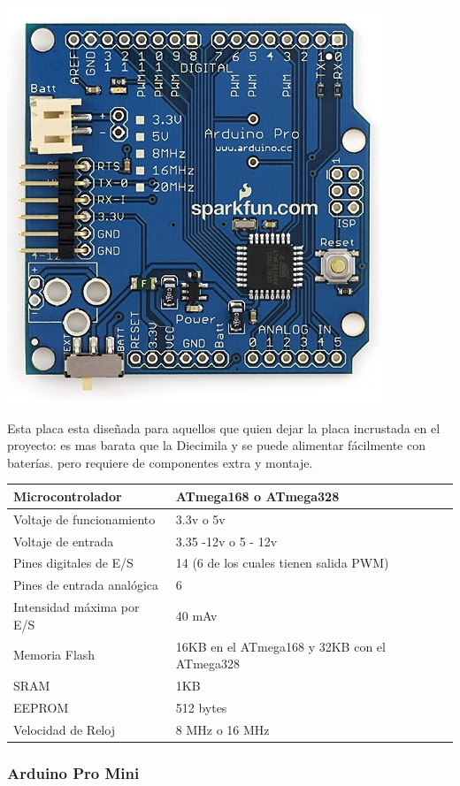 \documentclass[12pt,a4paper]{report}
\begin{document}
\includegraphics[scale=0.6]{ArduinoPro.jpg}

Esta placa esta diseñada para aquellos que quien dejar la placa incrustada en el
proyecto: es mas barata que la Diecimila y se puede alimentar fácilmente con
baterías. pero requiere de componentes extra y montaje. 

\begin{tabular}{||l | l ||}
\hline
\hline
Microcontrolador & ATmega168 o ATmega328\\
\hline
Voltaje de funcionamiento & 3.3v o 5v\\
\hline
Voltaje de entrada & 3.35 -12v o 5 - 12v\\
\hline
Pines digitales de E/S & 14 (6 de los cuales tienen salida PWM)\\
\hline
Pines de entrada analógica & 6\\
\hline
Intensidad máxima por E/S & 40 mAv\\
\hline
Memoria Flash & 16KB en el ATmega168 y 32KB con el ATmega328 \\
\hline
SRAM & 1KB\\
\hline
EEPROM & 512 bytes\\
\hline
Velocidad de Reloj & 8 MHz o 16 MHz\\
\hline
\hline
\end{tabular}

\subsubsection{Arduino Pro Mini}
\end{document}
